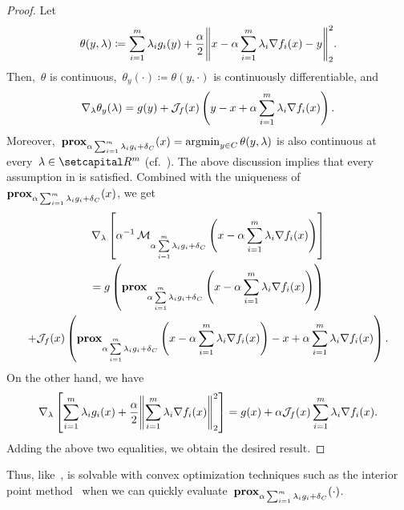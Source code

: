 \documentclass[../../main]{subfiles}
\begin{document}
\begin{proof}
    Let
    \begin{equation}
        \theta(y, \lambda) \coloneqq \sum_{i = 1}^{m} \lambda_i g_i(y) + \frac{\alpha}{2} \norm*{x - \alpha \sum_{i = 1}^{m} \lambda_i \nabla f_i(x) - y}_2^2
        .\end{equation}
    Then,~$\theta$ is continuous,~$\theta_y(\cdot) \coloneqq \theta(y, \cdot)$ is continuously differentiable, and
    \begin{equation}
        \nabla_\lambda \theta_y(\lambda) = g(y) + \mathcal{J}_{f}(x) \left( y - x + \alpha \sum_{i = 1}^{m} \lambda_i \nabla f_i(x) \right)
        .\end{equation}
    Moreover,~$\operatorname{\mathbf{prox}}_{\alpha \sum_{i = 1}^{m} \lambda_i g_i + \operatorname{\delta}_C}(x) = \operatorname*{argmin}_{y \in C} \theta(y, \lambda)$ is also continuous at every~$\lambda \in \setR^m$ (cf.~\cite[Excercise 7.38]{Rockafellar1998}).
    The above discussion implies that every assumption in  is satisfied.
    Combined with the uniqueness of~$\operatorname{\mathbf{prox}}_{\alpha \sum_{i = 1}^{m} \lambda_i g_i + \operatorname{\delta}_C}(x)$, we get
    \begin{multline}
        \nabla_\lambda \left[ \alpha^{-1} \operatorname{\mathcal{M}}_{\alpha \sum\limits_{i = 1}^{m} \lambda_i g_i + \operatorname{\delta}_C}\left( x - \alpha \sum_{i = 1}^{m} \lambda_i \nabla f_i(x) \right) \right] \\
        = g\left( \operatorname{\mathbf{prox}}_{\alpha \sum\limits_{i = 1}^{m} \lambda_i g_i + \operatorname{\delta}_C}\left( x - \alpha \sum_{i = 1}^{m} \lambda_i \nabla f_i(x) \right) \right) \\
        + \mathcal{J}_{f}(x) \left( \operatorname{\mathbf{prox}}_{\alpha \sum\limits_{i = 1}^{m} \lambda_i g_i + \operatorname{\delta}_C}\left( x - \alpha \sum_{i = 1}^{m} \lambda_i \nabla f_i(x) \right) - x + \alpha \sum_{i = 1}^{m} \lambda_i \nabla f_i(x) \right)
        .\end{multline}
    On the other hand, we have
    \begin{equation}
        \nabla_\lambda \left[ \sum_{i = 1}^{m} \lambda_i g_i(x) + \frac{\alpha}{2} \norm*{\sum_{i = 1}^{m} \lambda_i \nabla f_i(x)}_2^2 \right] = g(x) + \alpha \jdv{f}{x} \sum_{i = 1}^{m} \lambda_i \nabla f_i(x)
        .\end{equation}
    Adding the above two equalities, we obtain the desired result.
\end{proof}
Thus, like~,  is solvable with convex optimization techniques such as the interior point method~\cite{Bertsekas1999} when we can quickly evaluate~$\operatorname{\mathbf{prox}}_{\alpha \sum_{i = 1}^{m} \lambda_i g_i + \operatorname{\delta}_C}(\cdot)$.
\end{document}
